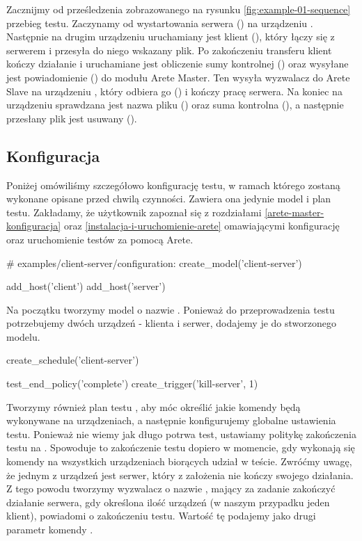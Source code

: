 \documentclass[00-praca-magisterska.tex]{subfiles}
\begin{document}
Zacznijmy od prześledzenia zobrazowanego na rysunku \ref{fig:example-01-sequence}
przebieg testu. Zaczynamy od wystartowania serwera () na urządzeniu
.  Następnie na drugim urządzeniu uruchamiany jest klient
(), który łączy się z serwerem i przesyła do niego wskazany plik. Po
zakończeniu transferu klient kończy działanie i uruchamiane jest obliczenie sumy
kontrolnej () oraz wysyłane jest powiadomienie () do modułu
Arete Master. Ten wysyła wyzwalacz do Arete Slave na urządzeniu ,
który odbiera go () i kończy pracę serwera. Na koniec na urządzeniu
 sprawdzana jest nazwa pliku () oraz suma kontrolna
(), a następnie przesłany plik jest usuwany ().

\subsection{Konfiguracja}

Poniżej omówiliśmy szczegółowo konfigurację testu, w ramach którego zostaną
wykonane opisane przed chwilą czynności. Zawiera ona jedynie model i plan testu.
Zakładamy, że użytkownik zapoznał się z rozdziałami \ref{arete-master-konfiguracja}
oraz \ref{instalacja-i-uruchomienie-arete} omawiającymi konfigurację oraz uruchomienie
testów za pomocą Arete.

\begin{pythoncode}
  # examples/client-server/configuration:
  create_model('client-server')

  add_host('client')
  add_host('server')
\end{pythoncode}

Na początku tworzymy model o nazwie . Ponieważ do
przeprowadzenia testu potrzebujemy dwóch urządzeń - klienta i serwer, dodajemy
je do stworzonego modelu. 

\begin{pythoncode}
  create_schedule('client-server')

  test_end_policy('complete')
  create_trigger('kill-server', 1)
\end{pythoncode}

Tworzymy również plan testu , aby móc określić jakie
komendy będą wykonywane na urządzeniach, a następnie konfigurujemy globalne
ustawienia testu. Ponieważ nie wiemy jak długo potrwa test, ustawiamy politykę
zakończenia testu na . Spowoduje to zakończenie testu dopiero w
momencie, gdy wykonają się komendy na wszystkich urządzeniach biorących udział
w teście.  Zwróćmy uwagę, że jednym z urządzeń jest serwer, który z założenia
nie kończy swojego działania. Z tego powodu tworzymy wyzwalacz o nazwie
, mający za zadanie zakończyć działanie serwera, gdy
określona ilość urządzeń (w naszym przypadku jeden klient), powiadomi o
zakończeniu testu. Wartość tę podajemy jako drugi parametr komendy
.
\end{document}

